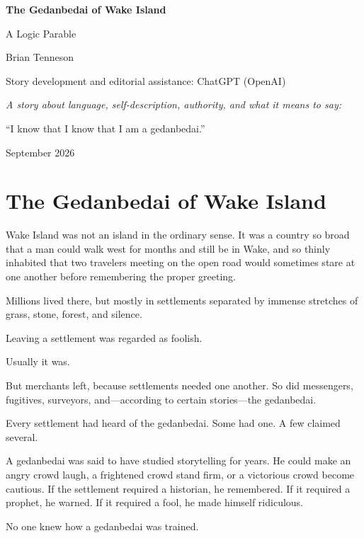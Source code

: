 \documentclass[11pt]{article}
\begin{document}
\begin{titlepage}
\centering
\vspace*{1.4in}
{\Huge\bfseries The Gedanbedai of Wake Island\par}
\vspace{0.35in}
{\Large A Logic Parable\par}
\vspace{0.75in}
{\large Brian Tenneson\par}
\vspace{0.15in}
{\normalsize Story development and editorial assistance: ChatGPT (OpenAI)\par}
\vfill
{\itshape A story about language, self-description, authority, and what it means to say:\par}
\vspace{0.15in}
{\large ``I know that I know that I am a gedanbedai.''\par}
\vfill
September 2026
\end{titlepage}

\section*{The Gedanbedai of Wake Island}

Wake Island was not an island in the ordinary sense. It was a country so broad that a man could walk west for months and still be in Wake, and so thinly inhabited that two travelers meeting on the open road would sometimes stare at one another before remembering the proper greeting.

Millions lived there, but mostly in settlements separated by immense stretches of grass, stone, forest, and silence.

Leaving a settlement was regarded as foolish.

Usually it was.

But merchants left, because settlements needed one another. So did messengers, fugitives, surveyors, and---according to certain stories---the gedanbedai.

Every settlement had heard of the gedanbedai. Some had one. A few claimed several.

A gedanbedai was said to have studied storytelling for years. He could make an angry crowd laugh, a frightened crowd stand firm, or a victorious crowd become cautious. If the settlement required a historian, he remembered. If it required a prophet, he warned. If it required a fool, he made himself ridiculous.

No one knew how a gedanbedai was trained.
\end{document}
